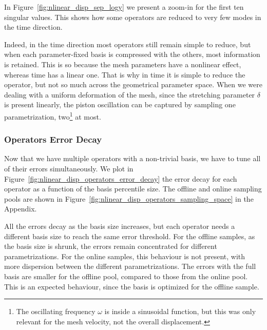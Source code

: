 \documentclass[../../thesis.tex]{subfiles}
\begin{document}
In Figure~\ref{fig:nlinear_disp_sep_logy} we present 
a zoom-in for the first ten singular values.
This shows how some operators are reduced 
to very few modes in the time direction.

Indeed, in the time direction most operators still remain simple to reduce, 
but when each parameter-fixed basis is compressed with the others,
most information is retained.
This is so because the mesh parameters have a nonlinear effect, 
whereas time has a linear one.
That is why in time it is simple to reduce the operator,
but not so much across the geometrical parameter space.
When we were dealing with a uniform deformation of the mesh,
since the stretching parameter $\delta$ is present linearly,
the piston oscillation can be captured by sampling one parametrization,
two\footnote
{
    The oscillating frequency $\omega$ is inside a sinusoidal function,
    but this was only relevant for the mesh velocity, 
    not the overall displacement.
} at most.

\subsubsection{Operators Error Decay}
Now that we have multiple operators with a non-trivial basis, 
we have to tune all of their errors simultaneously.
We plot in Figure~\ref{fig:nlinear_disp_operators_error_decay}
the error decay for each operator as a function of the basis percentile size.
The offline and online sampling pools are shown in
Figure~\ref{fig:nlinear_disp_operators_sampling_space} in the Appendix.

All the errors decay as the basis size increases, 
but each operator needs a different basis size to reach the same error threshold.
For the offline samples, as the basis size is shrunk, 
the errors remain concentrated for different parametrizations.
For the online samples, this behaviour is not present, 
with more dispersion between the different parametrizations.
The errors with the full basis are smaller for the offline pool, 
compared to those from the online pool.
This is an expected behaviour, 
since the basis is optimized for the offline sample.
\end{document}
